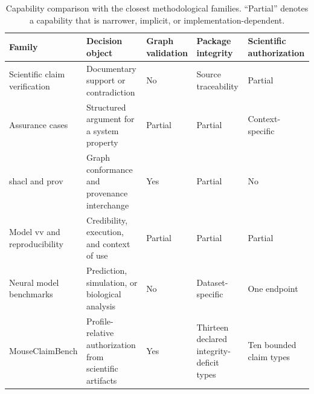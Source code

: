 \begin{table}[!htbp]
\centering
\caption{Capability comparison with the closest methodological families. ``Partial'' denotes a capability that is narrower, implicit, or implementation-dependent.}
\label{tab:related-work-v2}
\scriptsize
\renewcommand{\arraystretch}{1.00}
\begin{tabularx}{\textwidth}{@{}P{0.20\textwidth}P{0.21\textwidth}P{0.12\textwidth}P{0.14\textwidth}Y@{}}
\toprule
Family & Decision object & Graph validation & Package integrity & Scientific authorization \\
\midrule
Scientific claim verification \citep{wadden2020scifact,wadden2022multivers} & Documentary support or contradiction & No & Source traceability & Partial \\
Assurance cases \citep{batarseh2021assurance,mohamad2021assurance} & Structured argument for a system property & Partial & Partial & Context-specific \\
\ac{shacl} and \ac{prov} \citep{lebo2013provo,w3c2017shacl} & Graph conformance and provenance interchange & Yes & Partial & No \\
Model \ac{vv} and reproducibility \citep{asme2018vv40,pineau2021reproducibility} & Credibility, execution, and context of use & Partial & Partial & Partial \\
Neural model benchmarks \citep{willeke2022sensorium,turishcheva2023dynamic} & Prediction, simulation, or biological analysis & No & Dataset-specific & One endpoint \\
MouseClaimBench & Profile-relative authorization from scientific artifacts & Yes & Thirteen declared integrity-deficit types & Ten bounded claim types \\
\bottomrule
\end{tabularx}
\end{table}
